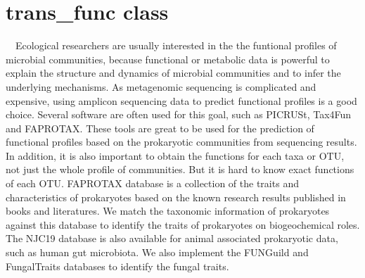 \documentclass[
]{book}
\newenvironment{Shaded}{\begin{snugshade}}{\end{snugshade}}
\newcommand{\AttributeTok}[1]{\textcolor[rgb]{0.77,0.63,0.00}{#1}}
\newcommand{\CommentTok}[1]{\textcolor[rgb]{0.56,0.35,0.01}{\textit{#1}}}
\newcommand{\ConstantTok}[1]{\textcolor[rgb]{0.00,0.00,0.00}{#1}}
\newcommand{\FloatTok}[1]{\textcolor[rgb]{0.00,0.00,0.81}{#1}}
\newcommand{\FunctionTok}[1]{\textcolor[rgb]{0.00,0.00,0.00}{#1}}
\newcommand{\NormalTok}[1]{#1}
\newcommand{\OtherTok}[1]{\textcolor[rgb]{0.56,0.35,0.01}{#1}}
\newcommand{\SpecialCharTok}[1]{\textcolor[rgb]{0.00,0.00,0.00}{#1}}
\newcommand{\StringTok}[1]{\textcolor[rgb]{0.31,0.60,0.02}{#1}}
\begin{document}
\begin{Shaded}
\end{Shaded}

\hypertarget{trans_func-class}{%
\section{trans\_func class}\label{trans_func-class}}

　Ecological researchers are usually interested in the the funtional profiles of microbial communities,
because functional or metabolic data is powerful to explain the structure and dynamics of microbial communities and to infer the underlying mechanisms.
As metagenomic sequencing is complicated and expensive, using amplicon sequencing data to predict functional profiles is a good choice.
Several software are often used for this goal, such as PICRUSt\citep{Langille_Predictive_2013}, Tax4Fun\citep{Aßhauer_Tax4Fun_2015} and FAPROTAX\citep{Louca_High_2016, Louca_Decoupling_2016}.
These tools are great to be used for the prediction of functional profiles based on the prokaryotic communities from sequencing results.
In addition, it is also important to obtain the functions for each taxa or OTU, not just the whole profile of communities.
But it is hard to know exact functions of each OTU.
FAPROTAX database is a collection of the traits and characteristics of prokaryotes based on the known research results published in books and literatures.
We match the taxonomic information of prokaryotes against this database to identify the traits of prokaryotes on biogeochemical roles.
The NJC19 database\citep{Lim_Large_2020} is also available for animal associated prokaryotic data, such as human gut microbiota.
We also implement the FUNGuild \citep{Nguyen_FUNGuild_2016} and FungalTraits \citep{Polme_FungalTraits_2020} databases to identify the fungal traits.
\end{document}
